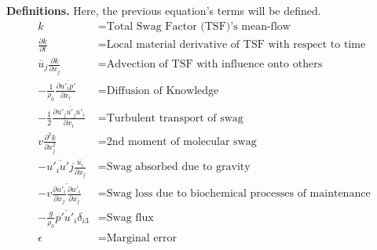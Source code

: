 \documentclass[12pt]{article}
\begin{document}
 
 \noindent\textbf{Definitions.}
Here, the previous equation's terms will be defined.
\begin{align*}
k & = \text{Total Swag Factor (TSF)'s mean-flow} \\
\frac{\partial k}{\partial t} & = \text{Local material derivative of TSF with respect to time}\\
\overline{u}_j \frac{\partial k}{\partial x_j}
& = \text{Advection of TSF with influence onto others} \\
- \frac{1}{\rho_0} \frac{\partial \overline{u'_ip'}}{\partial x_i} & = 
\text{Diffusion of Knowledge}\\
- \frac{1}{2} \frac{\partial \overline{u'_ju'_ju'_i}}{\partial x_i} & = 
\text{Turbulent transport of swag}\\
 v \frac{\partial^2k}{\partial x^2_j} & = 
 \text{2nd moment of molecular swag}\\
- \overline{u'_iu'j}\frac{\overline{u_i}}{\partial x_j} & = \text{Swag absorbed due to gravity}\\
- v \overline{\frac{\partial u'_i}{\partial x_j}\frac{\partial u'_i}{\partial x_j}} & = 
\text{Swag loss due to biochemical processes of maintenance}\\
- \frac{g}{\rho_0}\overline{p'u'_i}\delta_{i3} & = 
\text{Swag flux}\\
\epsilon & = \text{Marginal error}
\end{align*}
 

 
\end{document}
